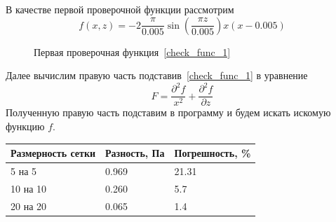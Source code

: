 \documentclass[a4paper,14pt]{extarticle}
\begin{document}
В качестве первой проверочной функции рассмотрим
\begin{equation}
	f(x, z) = -2 \frac{\pi }{0.005} \sin{\left(\frac{\pi z}{0.005}\right)} x \left(x - 0.005\right)
	\label{check_func_1}
\end{equation}
\begin{figure}[!htbp]
	\caption{Первая проверочная функция~\eqref{check_func_1}}
	\label{check_func_1_pic}
\end{figure}
Далее вычислим правую часть подставив~\eqref{check_func_1} в уравнение
\begin{equation*}
	F = \frac{\partial^2 f}{x^2} + \frac{\partial^2 f}{\partial z}
\end{equation*}
Полученную правую часть подставим в программу и будем искать искомую функцию $f$.

\begin{table}[!htbp]
	\begin{tabular}{|l|l|l|}
		\hline
		\multicolumn{1}{|c|}{Размерность сетки} & \multicolumn{1}{c|}{Разность, Па} & Погрешность, \% \\ \hline
		5 на 5                                  & 0.969                              & 21.31            \\ \hline
		10 на 10                                & 0.260                              & 5.7            \\ \hline
		20 на 20                                & 0.065                              & 1.4            \\ \hline
	\end{tabular}
\end{table}
\end{document}
